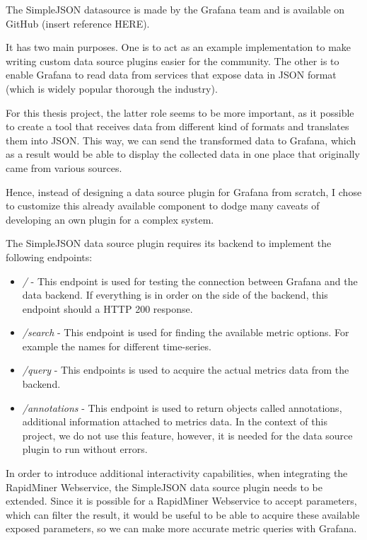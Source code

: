 The SimpleJSON datasource is made by the Grafana team and is available on GitHub (insert reference HERE).

It has two main purposes. One is to act as an example implementation to make writing custom data source plugins easier for the community. The other is to enable Grafana to read data from services that expose data in JSON format (which is widely popular thorough the industry).

For this thesis project, the latter role seems to be more important, as it possible to create a tool that receives data from different kind of formats and translates them into JSON. This way, we can send the transformed data to Grafana, which as a result would be able to display the collected data in one place that originally came from various sources.

Hence, instead of designing a data source plugin for Grafana from scratch, I chose to customize this already available component to dodge many caveats of developing an own plugin for a complex system.

The SimpleJSON data source plugin requires its backend to implement the following endpoints:

\begin{itemize}
	\item \emph{/} - This endpoint is used for testing the connection between Grafana and the data backend. If everything is in order on the side of the backend, this endpoint should a HTTP 200 response.
	\item \emph{/search} - This endpoint is used for finding the available metric options. For example the names for different time-series.
	\item \emph{/query} - This endpoints is used to acquire the actual metrics data from the backend.
	\item \emph{/annotations} - This endpoint is used to return objects called annotations, additional information attached to metrics data. In the context of this project, we do not use this feature, however, it is needed for the data source plugin to run without errors.
\end{itemize}

In order to introduce additional interactivity capabilities, when integrating the RapidMiner Webservice, the SimpleJSON data source plugin needs to be extended. Since it is possible for a RapidMiner Webservice to accept parameters, which can filter the result, it would be useful to be able to acquire these available exposed parameters, so we can make more accurate metric queries with Grafana.

